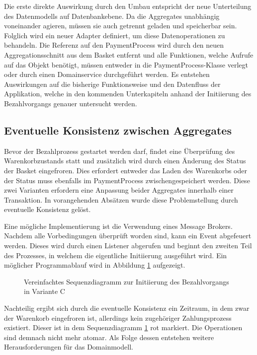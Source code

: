 
Die erste direkte Auswirkung durch den Umbau entspricht der neue Unterteilung des Datenmodells auf Datenbankebene. Da die Aggregates unabhängig voneinander agieren, müssen sie auch getrennt geladen und speicherbar sein. Folglich wird ein neuer Adapter definiert, um diese Datenoperationen zu behandeln. Die Referenz auf den PaymentProcess wird durch den neuen Aggregationsschnitt aus dem Basket entfernt und alle Funktionen, welche Aufrufe auf das Objekt benötigt, müssen entweder in die PaymentProcess-Klasse verlegt oder durch einen Domainservice durchgeführt werden. Es entstehen Auswirkungen auf die bisherige Funktionsweise und den Datenfluss der Applikation, welche in den kommenden Unterkapiteln anhand der Initiierung des Bezahlvorgangs genauer untersucht werden.

\subsection{Eventuelle Konsistenz zwischen Aggregates}

Bevor der Bezahlprozess gestartet werden darf, findet eine Überprüfung des Warenkorbzustands statt und zusätzlich wird durch einen Änderung des Status der Basket eingefroren. Dies erfordert entweder das Laden des Warenkorbs oder der Status muss ebenfalls im PaymentProcess zwischengespeichert werden. Diese zwei Varianten erfordern eine Anpassung beider Aggregates innerhalb einer Transaktion. In vorangehenden Absätzen wurde diese Problemstellung durch eventuelle Konsistenz gelöst. 

Eine mögliche Implementierung ist die Verwendung eines Message Brokers. Nachdem alle Vorbedingungen überprüft worden sind, kann ein Event abgefeuert werden. Dieses wird durch einen Listener abgerufen und beginnt den zweiten Teil des Prozesses, in welchem die eigentliche Initiierung ausgeführt wird. Ein möglicher Programmablauf wird in Abbildung \ref{fig:VarC-Sequence} aufgezeigt.

\begin{figure}[htbp]
	\centering
	
	\caption{Vereinfachtes Sequenzdiagramm zur Initiierung des Bezahlvorgangs in Variante C}
	\label{fig:VarC-Sequence}
\end{figure}

Nachteilig ergibt sich durch die eventuelle Konsistenz ein Zeitraum, in dem zwar der Warenkorb eingefroren ist, allerdings kein zugehöriger Zahlungsprozess existiert. Dieser ist in dem Sequenzdiagramm \ref{fig:VarC-Sequence} rot markiert. Die Operationen sind demnach nicht mehr atomar. Als Folge dessen entstehen weitere Herausforderungen für das Domainmodell. 


